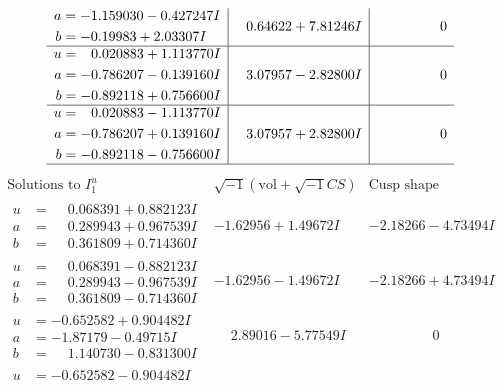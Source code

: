 \documentclass[1p]{elsarticle_modified}
\theoremstyle{definition}
\newcommand{\I}{\sqrt{-1}}
\begin{document}
$$\begin{array}{c|c|c}
\begin{aligned}
a &= -1.159030 - 0.427247 I \\
b &= -0.19983 + 2.03307 I\end{aligned}
 & \phantom{-}0.64622 + 7.81246 I & \phantom{-0.000000 } 0 \\ \hline\begin{aligned}
u &= \phantom{-}0.020883 + 1.113770 I \\
a &= -0.786207 - 0.139160 I \\
b &= -0.892118 + 0.756600 I\end{aligned}
 & \phantom{-}3.07957 - 2.82800 I & \phantom{-0.000000 } 0 \\ \hline\begin{aligned}
u &= \phantom{-}0.020883 - 1.113770 I \\
a &= -0.786207 + 0.139160 I \\
b &= -0.892118 - 0.756600 I\end{aligned}
 & \phantom{-}3.07957 + 2.82800 I & \phantom{-0.000000 } 0\\
 \hline 
 \end{array}$$\newpage$$\begin{array}{c|c|c}  
\text{Solutions to }I^u_{1}& \I (\text{vol} + \sqrt{-1}CS) & \text{Cusp shape}\\
 \hline 
\begin{aligned}
u &= \phantom{-}0.068391 + 0.882123 I \\
a &= \phantom{-}0.289943 + 0.967539 I \\
b &= \phantom{-}0.361809 + 0.714360 I\end{aligned}
 & -1.62956 + 1.49672 I & -2.18266 - 4.73494 I \\ \hline\begin{aligned}
u &= \phantom{-}0.068391 - 0.882123 I \\
a &= \phantom{-}0.289943 - 0.967539 I \\
b &= \phantom{-}0.361809 - 0.714360 I\end{aligned}
 & -1.62956 - 1.49672 I & -2.18266 + 4.73494 I \\ \hline\begin{aligned}
u &= -0.652582 + 0.904482 I \\
a &= -1.87179 - 0.49715 I \\
b &= \phantom{-}1.140730 - 0.831300 I\end{aligned}
 & \phantom{-}2.89016 - 5.77549 I & \phantom{-0.000000 } 0 \\ \hline\begin{aligned}
u &= -0.652582 - 0.904482 I \\

\end{aligned}
\end{array}$$
\end{document}
